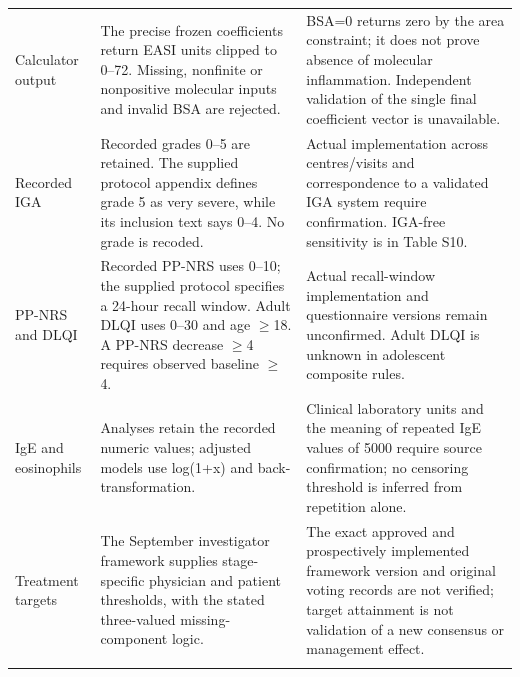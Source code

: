 \begin{longtable}{p{29mm}p{72mm}p{55mm}}
Calculator output & The precise frozen coefficients return EASI units clipped to 0--72. Missing, nonfinite or nonpositive molecular inputs and invalid BSA are rejected. & BSA=0 returns zero by the area constraint; it does not prove absence of molecular inflammation. Independent validation of the single final coefficient vector is unavailable. \\ \addlinespace
Recorded IGA & Recorded grades 0--5 are retained. The supplied protocol appendix defines grade 5 as very severe, while its inclusion text says 0--4. No grade is recoded. & Actual implementation across centres/visits and correspondence to a validated IGA system require confirmation. IGA-free sensitivity is in Table S10. \\ \addlinespace
PP-NRS and DLQI & Recorded PP-NRS uses 0--10; the supplied protocol specifies a 24-hour recall window. Adult DLQI uses 0--30 and age $\geq$18. A PP-NRS decrease $\geq$4 requires observed baseline $\geq$4. & Actual recall-window implementation and questionnaire versions remain unconfirmed. Adult DLQI is unknown in adolescent composite rules. \\ \addlinespace
IgE and eosinophils & Analyses retain the recorded numeric values; adjusted models use log(1+x) and back-transformation. & Clinical laboratory units and the meaning of repeated IgE values of 5000 require source confirmation; no censoring threshold is inferred from repetition alone. \\ \addlinespace
Treatment targets & The September investigator framework supplies stage-specific physician and patient thresholds, with the stated three-valued missing-component logic. & The exact approved and prospectively implemented framework version and original voting records are not verified; target attainment is not validation of a new consensus or management effect. \\ \addlinespace
\bottomrule\end{longtable}
